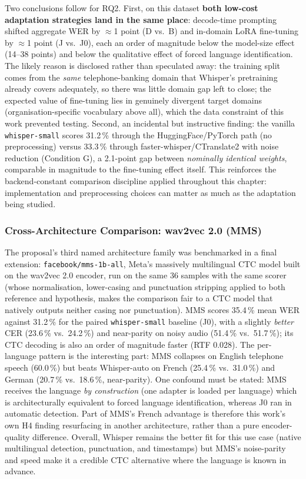 \documentclass[12pt]{report}
\begin{document}
Two conclusions follow for RQ2. First, on this dataset \textbf{both low-cost adaptation strategies land in the same place}: decode-time prompting shifted aggregate WER by $\approx$1 point (D vs.\ B) and in-domain LoRA fine-tuning by $\approx$1 point (J vs.\ J0), each an order of magnitude below the model-size effect (14--38 points) and below the qualitative effect of forced language identification. The likely reason is disclosed rather than speculated away: the training split comes from the \emph{same} telephone-banking domain that Whisper's pretraining already covers adequately, so there was little domain gap left to close; the expected value of fine-tuning lies in genuinely divergent target domains (organisation-specific vocabulary above all), which the data constraint of this work prevented testing. Second, an incidental but instructive finding: the vanilla \texttt{whisper-small} scores 31.2\,\% through the HuggingFace/PyTorch path (no preprocessing) versus 33.3\,\% through faster-whisper/CTranslate2 with noise reduction (Condition G), a 2.1-point gap between \emph{nominally identical weights}, comparable in magnitude to the fine-tuning effect itself. This reinforces the backend-constant comparison discipline applied throughout this chapter: implementation and preprocessing choices can matter as much as the adaptation being studied.
\subsubsection{Cross-Architecture Comparison: wav2vec 2.0 (MMS)}
The proposal's third named architecture family was benchmarked in a final extension: \texttt{facebook/mms-1b-all}, Meta's massively multilingual CTC model built on the wav2vec 2.0 encoder, run on the same 36 samples with the same scorer (whose normalisation, lower-casing and punctuation stripping applied to both reference and hypothesis, makes the comparison fair to a CTC model that natively outputs neither casing nor punctuation). MMS scores 35.4\,\% mean WER against 31.2\,\% for the paired \texttt{whisper-small} baseline (J0), with a slightly \emph{better} CER (23.6\,\% vs.\ 24.2\,\%) and near-parity on noisy audio (51.4\,\% vs.\ 51.7\,\%); its CTC decoding is also an order of magnitude faster (RTF 0.028). The per-language pattern is the interesting part: MMS collapses on English telephone speech (60.0\,\%) but beats Whisper-auto on French (25.4\,\% vs.\ 31.0\,\%) and German (20.7\,\% vs.\ 18.6\,\%, near-parity). One confound must be stated: MMS receives the language \emph{by construction} (one adapter is loaded per language) which is architecturally equivalent to forced language identification, whereas J0 ran in automatic detection. Part of MMS's French advantage is therefore this work's own H4 finding resurfacing in another architecture, rather than a pure encoder-quality difference. Overall, Whisper remains the better fit for this use case (native multilingual detection, punctuation, and timestamps) but MMS's noise-parity and speed make it a credible CTC alternative where the language is known in advance.
\end{document}
